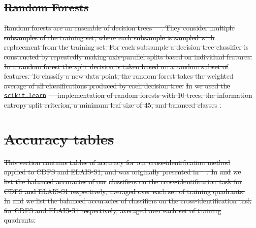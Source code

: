 \documentclass[11pt, a4paper]{book}
\providecommand{\DIFdeltex}[1]{{\protect\color{red}\sout{#1}}}                      %
\providecommand{\DIFdel}[1]{\texorpdfstring{\DIFdeltex{#1}}{}} %
\begin{document}
\subsection{\DIFdel{Random Forests}}
\addtocounter{subsection}{-1}%

\DIFdel{Random forests are an ensemble of decision
    trees~\mbox{%
\citep{breiman01random-forest}}\hspace{0pt}%
. They consider multiple subsamples of
    the training set, where each subsample is sampled with replacement from
    the training set. For each subsample a decision tree classifier is
    constructed by repeatedly making axis-parallel splits based on individual
    features. In a random forest the split decision is taken based on a random
    subset of features. To classify a new data point, the random forest takes
    the weighted average of all classifications produced by each decision
    tree. }%
\DIFdel{In }%
\DIFdel{we used the }\texttt{\DIFdel{scikit-learn}} %
\DIFdel{\mbox{%
\citep{pedregosa11sklearn}
    }\hspace{0pt}%
implementation of random forests with 10 trees, the information entropy
    split criterion, a minimum leaf size of 45, and balanced classes}%
\DIFdel{.
}%

\section{\DIFdel{Accuracy tables}}%
\addtocounter{section}{-1}%

\DIFdel{This section contains tables of accuracy for our cross-identification method applied to CDFS and
  ELAIS-S1, and was originally presented in \mbox{%
\citet{alger18radio}}\hspace{0pt}%
. In }%
\DIFdel{and }%
\DIFdel{we list the
  balanced accuracies of our }%
\DIFdel{classifiers on the cross-identification task for CDFS
  and ELAIS-S1 respectively, averaged over each set of training quadrants. In
  }%
\DIFdel{and }%
\DIFdel{we list the balanced
  accuracies of classifiers on the cross-identification task for CDFS and
  ELAIS-S1 respectively, averaged over each set of training quadrants.
}%
\end{document}
